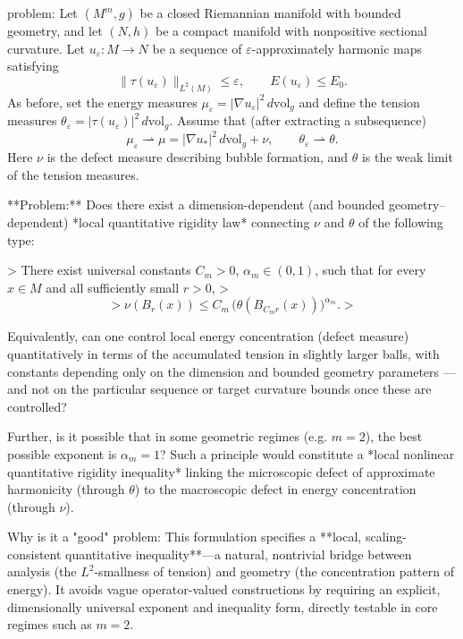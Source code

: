 problem:  
Let \( (M^m,g) \) be a closed Riemannian manifold with bounded geometry, and let \( (N,h) \) be a compact manifold with nonpositive sectional curvature.  
Let \(u_\varepsilon : M \to N\) be a sequence of \(\varepsilon\)-approximately harmonic maps satisfying
\[
\|\tau(u_\varepsilon)\|_{L^2(M)} \le \varepsilon, \qquad E(u_\varepsilon)\le E_0.
\]
As before, set the energy measures \(\mu_\varepsilon = |\nabla u_\varepsilon|^2\, d\mathrm{vol}_g\) and define the tension measures \(\theta_\varepsilon = |\tau(u_\varepsilon)|^2\, d\mathrm{vol}_g\).  
Assume that (after extracting a subsequence)
\[
\mu_\varepsilon \rightharpoonup \mu = |\nabla u_*|^2\, d\mathrm{vol}_g + \nu, 
\qquad \theta_\varepsilon \rightharpoonup \theta .
\]
Here \(\nu\) is the defect measure describing bubble formation, and \(\theta\) is the weak limit of the tension measures.

**Problem:**  
Does there exist a dimension-dependent (and bounded geometry–dependent) *local quantitative rigidity law* connecting \(\nu\) and \(\theta\) of the following type:

> There exist universal constants \(C_m>0\), \( \alpha_m \in (0,1) \), such that for every \(x\in M\) and all sufficiently small \(r>0\),
> \[
> \nu(B_r(x)) \le C_m\, \Big(\theta(B_{C_m r}(x))\Big)^{\alpha_m}.
> \]

Equivalently, can one control local energy concentration (defect measure) quantitatively in terms of the accumulated tension in slightly larger balls, with constants depending only on the dimension and bounded geometry parameters — and not on the particular sequence or target curvature bounds once these are controlled?

Further, is it possible that in some geometric regimes (e.g. \(m=2\)), the best possible exponent is \(\alpha_m=1\)?  
Such a principle would constitute a *local nonlinear quantitative rigidity inequality* linking the microscopic defect of approximate harmonicity (through \(\theta\)) to the macroscopic defect in energy concentration (through \(\nu\)).

Why is it a "good" problem:  
This formulation specifies a **local, scaling-consistent quantitative inequality**—a natural, nontrivial bridge between analysis (the \(L^2\)-smallness of tension) and geometry (the concentration pattern of energy). It avoids vague operator-valued constructions by requiring an explicit, dimensionally universal exponent and inequality form, directly testable in core regimes such as \(m=2\).  

